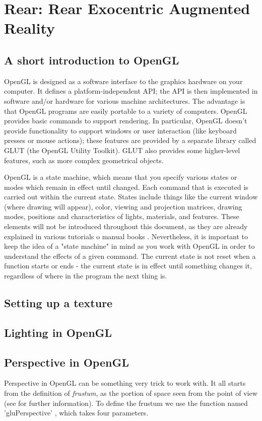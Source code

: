 \section{Rear: Rear Exocentric Augmented Reality}
\label{sec:rear}
\lstset{language=C}
\subsection{A short introduction to OpenGL}
OpenGL is designed as a software interface to the graphics 
hardware on your computer. It defines a platform-independent API;
the API is then implemented in software and/or hardware for 
various machine architectures. The advantage is that OpenGL 
programs are easily portable to a variety of computers. 
OpenGL provides basic commands to support rendering. 
In particular, OpenGL doesn't provide functionality to support
windows or user interaction (like keyboard presses or mouse 
actions); these features are provided by a separate library called
GLUT (the OpenGL Utility Toolkit). GLUT also provides some 
higher-level features, such as more complex geometrical objects.
%

%
OpenGL is a state machine, which means that you specify various 
states or modes which remain in effect until changed.
Each command that is executed is carried out within the current 
state. States include things like the current window (where
drawing will appear), color, viewing and projection matrices, 
drawing modes, positions and characteristics of lights,
materials, and features. These elements will not be introduced 
throughout this document, as they are already explained in
various tutorials \cite{opengl:brieftutorial} o manual books 
\cite{opengl:redbook}.
%
Nevertheless, it is important to keep the idea of a 
"state machine" in mind as you work with OpenGL in order to 
understand the effects of a given command. The current state 
is not reset when a function starts or ends - the current state
is in effect until something changes it, regardless of where 
in the program the next thing is. 
%
\subsection{Setting up a texture}


%
\subsection{Lighting in OpenGL}
%
\subsection{Perspective in OpenGL}
%
Perspective in OpenGL can be something very trick to work with. 
It all starts from the definition of \textit{frustum}, as the portion
of space seen from the point of view (see \cite{wiki:frustum} 
for further information). To define the frustum we use the function
named 'gluPerspective' \cite{opengl:gluPerspective}, which takes 
four parameters.
%

